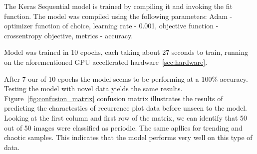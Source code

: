 \documentclass[a4paper,12pt,fleqn]{article}
\begin{document}
The Keras Sequential model is trained by compiling it and invoking the fit function.
The model was compiled using the following parameters: Adam - optimizer function of choice, learning rate - 0.001, objective function - crossentropy objective, metrics - accuracy.

Model was trained in 10 epochs, each taking about 27 seconds to train, running on the aforementioned GPU accellerated hardware~\ref{sec:hardware}.

After 7 our of 10 epochs the model seems to be performing at a 100\% accuracy.
Testing the model with novel data yields the same results.
Figure~\ref{fig:confusion_matrix} confusion matrix illustrates the results of predicting the charactestics of recurrence plot data before unseen to the model. Looking at the first column and first row of the matrix, we can identify that 50 out of 50 images were classified as periodic. The same apllies for trending and chaotic samples. This indicates that the model performs very well on this type of data.















\end{document}
